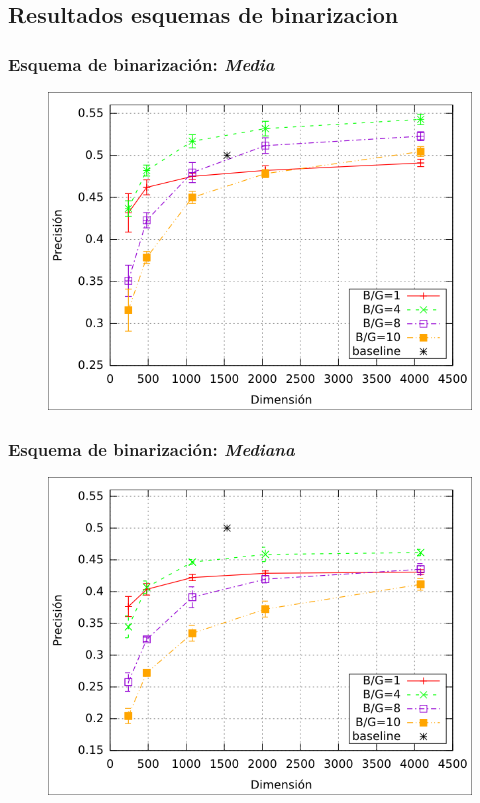	\subsection{Resultados esquemas de binarizacion}
		\begin{frame}
			\frametitle{Esquema de binarización: \textit{Media}}
			\begin{figure}[htbp!]
				\centering
				\centerline{
					\includegraphics[height=0.65\paperheight]{../img/resultados/reales/mean.png}
				}
			\end{figure}
		\end{frame}
		\begin{frame}
			\frametitle{Esquema de binarización: \textit{Mediana}}
			\begin{figure}[htbp!]
				\centering
				\centerline{
					\includegraphics[height=0.65\paperheight]{../img/resultados/reales/median.png}
				}
			\end{figure}
		\end{frame}
